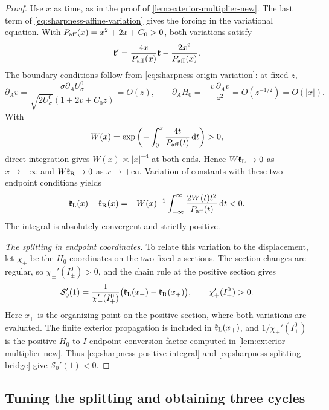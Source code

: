 \begin{proof}
Use \(x\) as time, as in the proof of
\cref{lem:exterior-multiplier-new}. The last term of
\eqref{eq:sharpness-affine-variation} gives the forcing in the
variational equation. With \(P_{\rm aff}(x)=x^2+2x+C_0>0\), both
variations satisfy
\[
 \mathfrak k'=\frac{4x}{P_{\rm aff}(x)}\mathfrak k-\frac{2x^2}{P_{\rm aff}(x)}.
\]
The boundary conditions follow from
\eqref{eq:sharpness-origin-variation}: at fixed \(z\),
\[
 \partial_Av
   =\frac{\sigma\partial_AU_\sigma^0}
       {\sqrt{2U_\sigma^0}(1+2v+C_0z)}=O(z),\qquad
 \partial_AH_0=-\frac{v\,\partial_Av}{z^2}
       =O(z^{-1/2})=O(|x|).
\]
With
\[
 W(x)=\exp\left(-\int_0^x\frac{4t}{P_{\rm aff}(t)}\,\mathrm d t\right)>0,
\]
direct integration gives \(W(x)\asymp|x|^{-4}\) at both ends.
Hence \(W\mathfrak k_{\rm L}\to0\) as \(x\to-\infty\) and
\(W\mathfrak k_{\rm R}\to0\) as \(x\to+\infty\). Variation of constants
with these two endpoint conditions yields
\begin{equation}
\label{eq:sharpness-positive-integral}
 \mathfrak k_{\rm L}(x)-\mathfrak k_{\rm R}(x)
 =-W(x)^{-1}\int_{-\infty}^{\infty}
                  \frac{2W(t)t^2}{P_{\rm aff}(t)}\,\mathrm d t<0.
\end{equation}
The integral is absolutely convergent and strictly positive.

\emph{The splitting in endpoint coordinates.}
To relate this variation to the displacement, let \(\chi_\pm\)
be the \(H_0\)-coordinates on the two fixed-\(z\) sections.
The section changes are regular, so \(\chi_\pm'(I_\pm^0)>0\), and
the chain rule at the positive section gives
\begin{equation}
\label{eq:sharpness-splitting-bridge}
 \mathcal S_0'(1)
 =\frac{1}{\chi_+'(I_+^0)}
   \bigl(\mathfrak k_{\rm L}(x_+)-\mathfrak k_{\rm R}(x_+)\bigr),
 \qquad \chi_+'(I_+^0)>0 .
\end{equation}
Here \(x_+\) is the organizing point on the positive section, where
both variations are evaluated. The finite exterior propagation is
included in \(\mathfrak k_{\rm L}(x_+)\), and
\(1/\chi_+'(I_+^0)\) is the positive \(H_0\)-to-\(I\) endpoint
conversion factor computed in \cref{lem:exterior-multiplier-new}.
Thus \eqref{eq:sharpness-positive-integral} and
\eqref{eq:sharpness-splitting-bridge} give \(\mathcal S_0'(1)<0\).
\end{proof}

\subsection{Tuning the splitting and obtaining three cycles}

